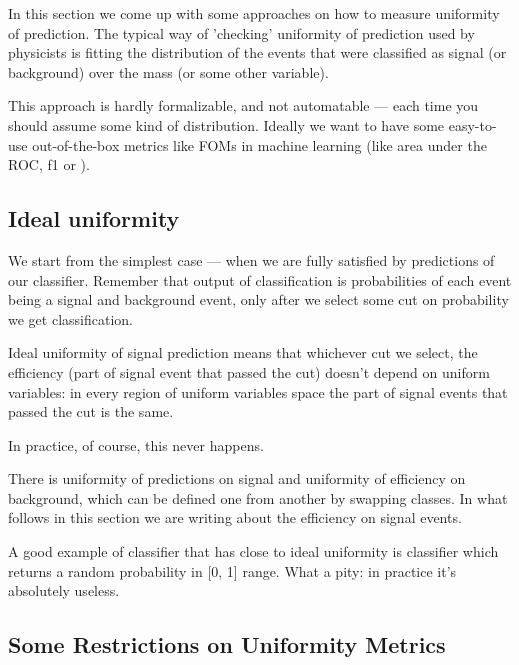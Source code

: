 In this section we come up with some approaches on how to measure uniformity of prediction. The typical way of 'checking' uniformity of prediction used by physicists 
is fitting the distribution of the events that were classified as signal (or background) over the mass (or some other variable).

This approach is hardly formalizable, and not automatable --- each time you should assume some kind of distribution. 
Ideally we want to have some easy-to-use out-of-the-box metrics like FOMs in machine learning (like area under the ROC, f1 or ).

\subsection{Ideal uniformity}

We start from the simplest case --- when we are fully satisfied by predictions of our classifier. Remember that output of 
classification is probabilities of each event being a signal and background event, only after we select some cut on probability we get classification.

Ideal uniformity of signal prediction means that whichever cut we select, the efficiency (part of signal event that passed the cut) doesn't depend on uniform variables: 
in every region of uniform variables space the part of signal events that passed the cut is the same.

In practice, of course, this never happens.

There is uniformity of predictions on signal and uniformity of efficiency on background, which can be defined one from another by swapping classes. 
In what follows in this section we are writing about the efficiency on signal events.

A good example of classifier that has close to ideal uniformity is classifier which returns a random probability in [0, 1] range. What a pity: in practice it's absolutely useless.


\subsection{Some Restrictions on Uniformity Metrics}

